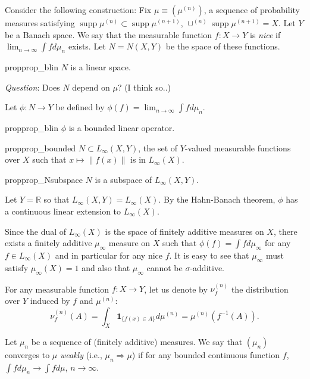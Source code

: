 \documentclass[12pt]{article}
\newcommand{\todoc}[2][]{\todo[color=Apricot,#1]{#2}}
\newcommand{\ra}{\rightarrow}
\newcommand{\real}{\mathbb{R}}
\newcommand{\one}[1]{\mathbf{1}_{\{#1\}}}
\DeclareMathOperator{\supp}{supp}
\begin{document}
Consider the following construction:
Fix  $\mu\equiv (\mu^{(n)})$, a sequence of probability measures satisfying $\supp \mu^{(n)} \subset \supp \mu^{(n+1)}$, $\cup^{(n)} \supp \mu^{(n+1)} = X$.
Let $Y$ be a Banach space.
\newcommand{\dmu}{d\mu}
We say that the measurable function $f:X\ra Y$ is \emph{nice} if $\lim_{n\ra\infty} \int f \dmu_n$ exists.
Let $N= N(X,Y)$ be the space of these functions.
\begin{restatable}{prop}{prop_blin}
$N$ is a linear space.
\end{restatable}

\noindent \emph{Question}: Does $N$ depend on $\mu$? (I think so..)

Let $\phi:N \ra Y$ be defined by $\phi(f) = \lim_{n\ra\infty} \int f \dmu_n$.
\begin{restatable}{prop}{prop_blin}
$\phi$ is a bounded linear operator.
\end{restatable}

\begin{restatable}{prop}{prop_bounded}
$N \subset L_{\infty}(X,Y)$, the set of $Y$-valued  measurable functions over $X$ such that $x\mapsto \| f(x)\|$ is in $L_{\infty}(X)$.
\end{restatable}

\begin{restatable}{prop}{prop_Nsubspace}
$N$ is a subspace of $L_{\infty}(X,Y)$.
\end{restatable}

Let $Y = \real$ so that $L_\infty(X,Y) = L_\infty(X)$.
By the Hahn-Banach theorem, $\phi$ has a continuous linear extension to $L_{\infty}(X)$. \todoc{Generalization for  $L_{\infty}(X,Y)$}

Since the dual of $L_{\infty}(X)$ is the space of finitely additive measures on $X$, there exists a finitely additive $\mu_\infty$ measure on $X$ such that $\phi(f) = \int f d\mu_{\infty}$ for any $f\in L_{\infty}(X)$ and in particular for any nice $f$.
It is easy to see that $\mu_\infty$ must satisfy $\mu_{\infty}(X) = 1$ and also that $\mu_\infty$ cannot be $\sigma$-additive.

For any measurable function $f:X \ra Y$, let us denote
by $\nu^{(n)}_f$ the distribution over $Y$ induced by $f$ and $\mu^{(n)}$:
\[
\nu^{(n)}_f(A) = \int_X \one{f(x)\in A} \dmu^{(n)} = \mu^{(n)}( f^{-1}(A) ).
\]

Let $\mu_n$ be a sequence of (finitely additive) measures.
We say that $(\mu_n)$ converges to $\mu$ \emph{weakly} (i.e., $\mu_n \Rightarrow \mu$) if for any bounded continuous function $f$, $\int f d\mu_n \ra \int f d\mu$, $n\ra\infty$.
\end{document}
